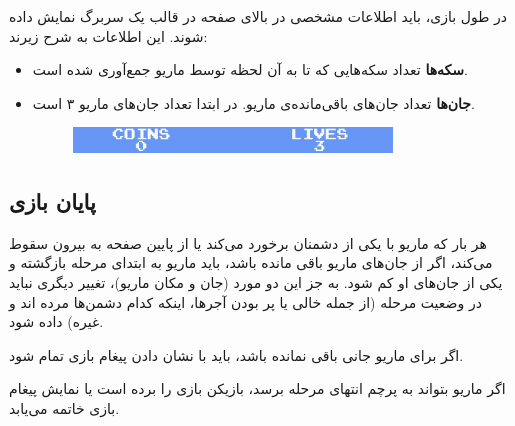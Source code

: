 \documentclass{utap}
\begin{document}
در طول بازی، باید اطلاعات مشخصی در بالای صفحه در قالب یک سربرگ نمایش داده شوند. این اطلاعات به شرح زیرند:
	\begin{itemize}
		\item
\textbf{سکه‌ها}
تعداد سکه‌هایی که تا به آن لحظه توسط ماریو جمع‌آوری شده است.
		\item
\textbf{جان‌ها}
تعداد جان‌های باقی‌مانده‌ی ماریو. در ابتدا تعداد جان‌های ماریو  ۳ است.
	\begin{figure}[H]
	\begin{center}
		\includegraphics[width=0.8\textwidth]{header}
	\end{center}
\end{figure}

	\end{itemize}

	\subsection{پایان بازی}
هر بار که ماریو با یکی از دشمنان برخورد می‌کند یا از پایین صفحه به بیرون سقوط می‌کند،  اگر از جان‌های ماریو باقی مانده باشد، باید ماریو به ابتدای مرحله بازگشته و یکی از جان‌های او کم شود. به جز این دو مورد (جان و مکان ماریو)، تغییر دیگری نباید در وضعیت مرحله (از جمله خالی یا پر بودن آجر‌ها، اینکه کدام دشمن‌ها مرده اند و غیره) داده شود.

اگر برای ماریو جانی باقی نمانده باشد، باید با نشان دادن پیغام  بازی تمام شود.

اگر ماریو بتواند به پرچم انتهای مرحله برسد، بازیکن بازی را برده است یا نمایش پیغام  بازی خاتمه می‌یابد.
\end{document}
